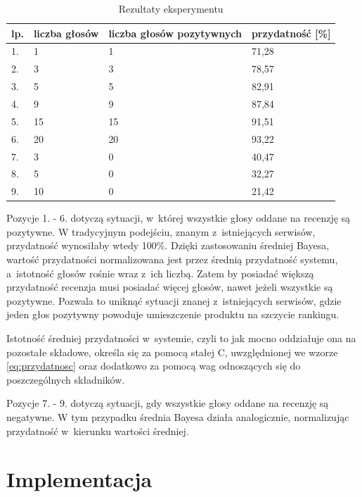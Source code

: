 \begin{table}[H]
\centering
    \begin{tabular}{|l|l|l|l|}
    \hline
    lp. & liczba głosów & liczba głosów pozytywnych & przydatność [\%] \\ \hline\hline
    1. & 1 & 1 & 71,28 \\ \hline
    2. & 3 & 3 & 78,57 \\ \hline
    3. & 5 & 5 & 82,91 \\ \hline
    4. & 9 & 9 & 87,84 \\ \hline
    5. & 15 & 15 & 91,51 \\ \hline
    6. & 20 & 20 & 93,22 \\ \hline
    7. & 3 & 0 & 40,47 \\ \hline
    8. & 5 & 0 & 32,27 \\ \hline
    9. & 10 & 0 & 21,42 \\ \hline
    \end{tabular}
	\caption{Rezultaty eksperymentu}\label{tab:test1}
\end{table}

Pozycje 1. - 6. dotyczą sytuacji, w~której wszystkie głosy oddane na recenzję są pozytywne. W tradycyjnym podejściu, znanym z~istniejących serwisów, przydatność wynosiłaby wtedy 100\%. Dzięki zastosowaniu średniej Bayesa, wartość przydatności normalizowana jest przez średnią przydatność systemu, a~istotność głosów rośnie wraz z~ich liczbą. Zatem by posiadać większą przydatność recenzja musi posiadać więcej głosów, nawet jeżeli wszystkie są pozytywne. Pozwala to uniknąć sytuacji znanej z~istniejących serwisów, gdzie jeden głos pozytywny powoduje umieszczenie produktu na szczycie rankingu.

Istotność średniej przydatności w~systemie, czyli to jak mocno oddziałuje ona na pozostałe składowe, określa się za pomocą stałej C, uwzględnionej we wzorze \ref{eq:przydatnosc} oraz dodatkowo za pomocą wag odnoszących się do poszczególnych składników.

Pozycje 7. - 9. dotyczą sytuacji, gdy wszystkie głosy oddane na recenzję są negatywne. W tym przypadku średnia Bayesa działa analogicznie, normalizując przydatność w~kierunku wartości średniej.


\section{Implementacja}

